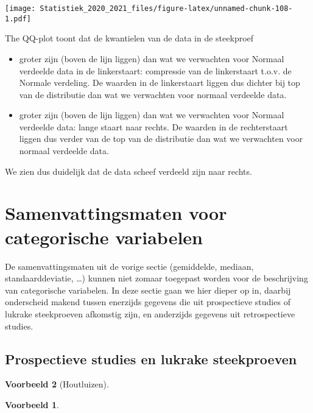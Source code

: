 \documentclass[
  12pt,dutch,coursenotes]{book}
\theoremstyle{definition}
\theoremstyle{definition}
\newtheorem{example}{Voorbeeld}[chapter]
\theoremstyle{definition}
\theoremstyle{remark}
\begin{document}
\texttt{[image: Statistiek\_2020\_2021\_files/figure-latex/unnamed-chunk-108-1.pdf]}

The QQ-plot toont dat de kwantielen van de data in de steekproef

\begin{itemize}
\item
  groter zijn (boven de lijn liggen) dan wat we verwachten voor Normaal verdeelde data in de linkerstaart: compressie van de linkerstaart t.o.v. de Normale verdeling. De waarden in de linkerstaart liggen dus dichter bij top van de distributie dan wat we verwachten voor normaal verdeelde data.
\item
  groter zijn (boven de lijn liggen) dan wat we verwachten voor Normaal verdeelde data: lange staart naar rechts. De waarden in de rechterstaart liggen dus verder van de top van de distributie dan wat we verwachten voor normaal verdeelde data.
\end{itemize}

We zien dus duidelijk dat de data scheef verdeeld zijn naar rechts.

\hypertarget{sec:explCatVar}{%
\section{Samenvattingsmaten voor categorische variabelen}\label{sec:explCatVar}}

De samenvattingsmaten uit de vorige sectie (gemiddelde, mediaan, standaarddeviatie, \ldots) kunnen niet zomaar toegepast worden voor de beschrijving van categorische variabelen. In deze sectie gaan we hier dieper op in, daarbij onderscheid makend tussen enerzijds gegevens die uit prospectieve studies of lukrake steekproeven afkomstig zijn, en anderzijds gegevens uit retrospectieve studies.

\hypertarget{prospectieve-studies-en-lukrake-steekproeven}{%
\subsection{Prospectieve studies en lukrake steekproeven}\label{prospectieve-studies-en-lukrake-steekproeven}}

\begin{example}[Houtluizen]
\begin{example}

\protect\hypertarget{exm:unnamed-chunk-109}{}{\label{exm:unnamed-chunk-109} \iffalse (Houtluizen) \fi{} }

\end{example}
\end{example}
\end{document}

